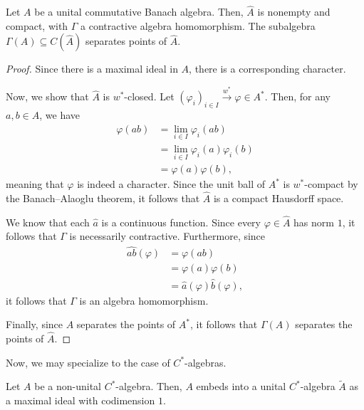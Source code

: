 \documentclass[10pt]{mypackage}
\begin{document}
\begin{theorem}
  Let $A$ be a unital commutative Banach algebra. Then, $\hat{A}$ is nonempty and compact, with $\Gamma$ a contractive algebra homomorphism. The subalgebra $\Gamma(A)\subseteq C(\hat{A})$ separates points of $\hat{A}$.
\end{theorem}
\begin{proof}
  Since there is a maximal ideal in $A$, there is a corresponding character.

  Now, we show that $\hat{A}$ is $w^{\ast}$-closed. Let $\left( \varphi_{i} \right)_{i\in I}\xrightarrow{w^{\ast}} \varphi\in A^{\ast}$. Then, for any $a,b\in A$, we have
  \begin{align*}
    \varphi\left( ab \right) &= \lim_{i\in I} \varphi_i\left( ab \right)\\
                             &= \lim_{i\in I}\varphi_i\left( a \right)\varphi_i\left( b \right)\\
                             &= \varphi\left( a \right)\varphi\left( b \right),
  \end{align*}
  meaning that $\varphi$ is indeed a character. Since the unit ball of $A^{\ast}$ is $w^{\ast}$-compact by the Banach--Alaoglu theorem, it follows that $\hat{A}$ is a compact Hausdorff space.

  We know that each $\hat{a}$ is a continuous function. Since every $\varphi\in \hat{A}$ has norm $1$, it follows that $\Gamma$ is necessarily contractive. Furthermore, since
  \begin{align*}
    \widehat{ab}\left( \varphi \right) &= \varphi\left( ab \right)\\
                                       &= \varphi(a)\varphi(b)\\
                                       &= \hat{a}(\varphi)\hat{b}(\varphi),
  \end{align*}
  it follows that $\Gamma$ is an algebra homomorphism.

  Finally, since $A$ separates the points of $A^{\ast}$, it follows that $\Gamma(A)$ separates the points of $\hat{A}$.
\end{proof}
Now, we may specialize to the case of $C^{\ast}$-algebras.
\begin{proposition}
  Let $A$ be a non-unital $C^{\ast}$-algebra. Then, $A$ embeds into a unital $C^{\ast}$-algebra $\widetilde{A}$ as a maximal ideal with codimension $1$.
\end{proposition}
\end{document}
